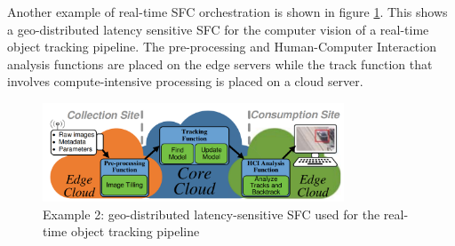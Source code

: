 Another example of real-time SFC orchestration is shown in figure \ref{fig:geosfc}. This shows a geo-distributed latency sensitive SFC for the computer vision of a real-time object tracking pipeline\cite{sfcgeo}. The pre-processing and Human-Computer Interaction analysis functions are placed on the edge servers while the track function that involves
compute-intensive processing is placed on a cloud server. 
\begin{figure}
	\centering
	\includegraphics[width=0.8\textwidth]{figs/geosfc.PNG}
		\vspace{\baselineskip}
	\caption{Example 2: geo-distributed latency-sensitive SFC used
		for the real-time object tracking pipeline \cite{sfcgeo}}
	\label{fig:geosfc}
\end{figure}


